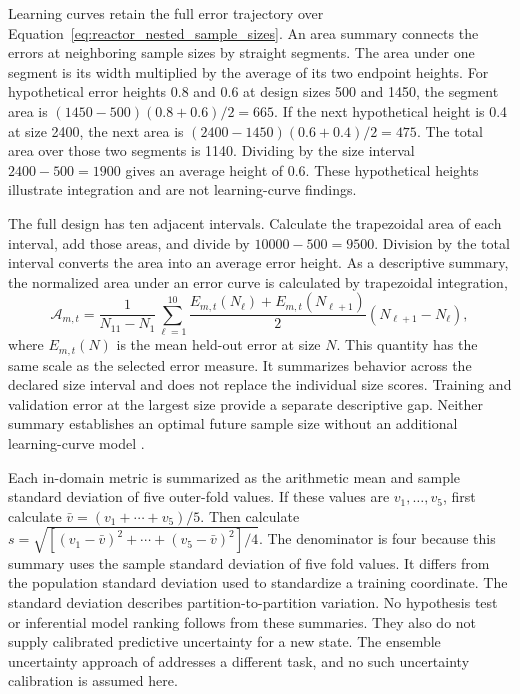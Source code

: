 Learning curves retain the full error trajectory over Equation~\eqref{eq:reactor_nested_sample_sizes}. An area summary connects the errors at neighboring sample sizes by straight segments. The area under one segment is its width multiplied by the average of its two endpoint heights. For hypothetical error heights 0.8 and 0.6 at design sizes 500 and 1450, the segment area is $(1450-500)(0.8+0.6)/2=665$. If the next hypothetical height is 0.4 at size 2400, the next area is $(2400-1450)(0.6+0.4)/2=475$. The total area over those two segments is 1140. Dividing by the size interval $2400-500=1900$ gives an average height of 0.6. These hypothetical heights illustrate integration and are not learning-curve findings.

The full design has ten adjacent intervals. Calculate the trapezoidal area of each interval, add those areas, and divide by $10000-500=9500$. Division by the total interval converts the area into an average error height. As a descriptive summary, the normalized area under an error curve is calculated by trapezoidal integration,
\begin{equation}
\mathcal{A}_{m,t}=
\frac{1}{N_{11}-N_1}
\sum_{\ell=1}^{10}\frac{E_{m,t}(N_\ell)+E_{m,t}(N_{\ell+1})}{2}
(N_{\ell+1}-N_\ell),
\label{eq:projection_learning_curve_area}
\end{equation}
where $E_{m,t}(N)$ is the mean held-out error at size $N$. This quantity has the same scale as the selected error measure. It summarizes behavior across the declared size interval and does not replace the individual size scores. Training and validation error at the largest size provide a separate descriptive gap. Neither summary establishes an optimal future sample size without an additional learning-curve model \citep{VieringLoog2023}.

Each in-domain metric is summarized as the arithmetic mean and sample standard deviation of five outer-fold values. If these values are $v_1,\ldots,v_5$, first calculate $\bar v=(v_1+\cdots+v_5)/5$. Then calculate $s=\sqrt{[(v_1-\bar v)^2+\cdots+(v_5-\bar v)^2]/4}$. The denominator is four because this summary uses the sample standard deviation of five fold values. It differs from the population standard deviation used to standardize a training coordinate. The standard deviation describes partition-to-partition variation. No hypothesis test or inferential model ranking follows from these summaries. They also do not supply calibrated predictive uncertainty for a new state. The ensemble uncertainty approach of \citet{Lakshminarayanan2017} addresses a different task, and no such uncertainty calibration is assumed here.

